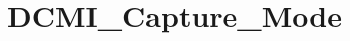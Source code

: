 \hypertarget{group___d_c_m_i___capture___mode}{\section{D\-C\-M\-I\-\_\-\-Capture\-\_\-\-Mode}
\label{group___d_c_m_i___capture___mode}
}
